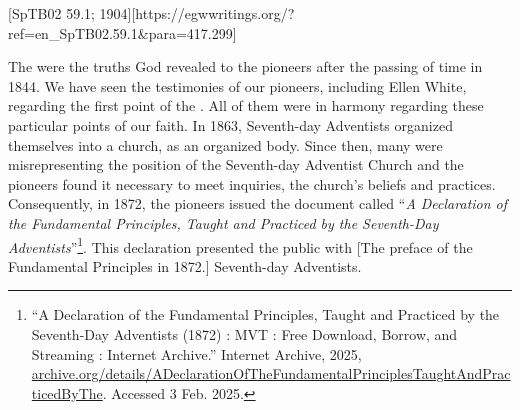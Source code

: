 [SpTB02 59.1; 1904][https://egwwritings.org/?ref=en\_SpTB02.59.1&para=417.299]


The  were the truths God revealed to the pioneers after the passing of time in 1844. We have seen the testimonies of our pioneers, including Ellen White, regarding the first point of the . All of them were in harmony regarding these particular points of our faith. In 1863, Seventh-day Adventists organized themselves into a church, as an organized body. Since then, many were misrepresenting the position of the Seventh-day Adventist Church and the pioneers found it necessary to meet inquiries,  the church’s beliefs and practices. Consequently, in 1872, the pioneers issued the document called “\textit{A Declaration of the Fundamental Principles, Taught and Practiced by the Seventh-Day Adventists}”\footnote{“A Declaration of the Fundamental Principles, Taught and Practiced by the Seventh-Day Adventists (1872) : MVT : Free Download, Borrow, and Streaming : Internet Archive.” Internet Archive, 2025, \href{https://archive.org/details/ADeclarationOfTheFundamentalPrinciplesTaughtAndPracticedByThe}{archive.org/details/ADeclarationOfTheFundamentalPrinciplesTaughtAndPracticedByThe}. Accessed 3 Feb. 2025.}. This declaration presented the public with [The preface of the Fundamental Principles in 1872.] Seventh-day Adventists.


